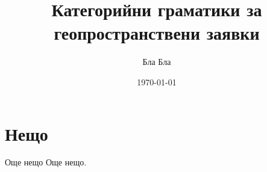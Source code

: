 \documentclass{beamer}
\title{Категорийни граматики за геопространствени заявки}
\date{\today}
\author{Бла Бла}
\institute{Магистър университет ФМИ бла}
\begin{document}
  \maketitle
  \section{Нещо}
  \begin{frame}{Още нещо}
    Още нещо.
  \end{frame}
\end{document}
